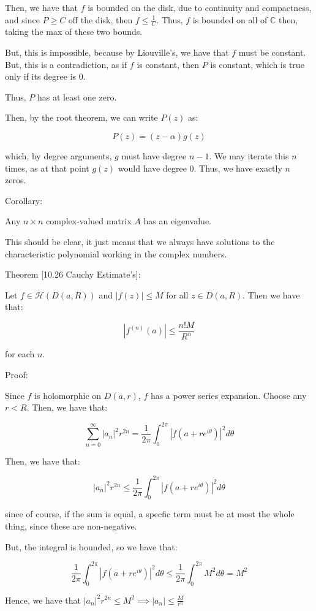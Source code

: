 \documentclass[10pt]{article}
\newcommand{\calH}{\mathcal{H}}
\begin{document}
Then, we have that $f$ is bounded on the disk, due to continuity and compactness, and since $P \geq C$ off the disk, then $f \leq \frac{1}{C}$. Thus, $f$ is bounded on all of $\mathbb{C}$ then, taking the max of these two bounds.

But, this is impossible, because by Liouville’s, we have that $f$ must be constant. But, this is a contradiction, as if $f$ is constant, then $P$ is constant, which is true only if its degree is $0$.

Thus, $P$ has at least one zero.

Then, by the root theorem, we can write $P(z)$ as:

$$P(z) = (z - \alpha) g(z)$$

which, by degree arguments, $g$ must have degree $n-1$. We may iterate this $n$ times, as at that point $g(z)$ would have degree $0$. Thus, we have exactly $n$ zeros.

Corollary:

Any $n \times n$ complex-valued matrix $A$ has an eigenvalue.

This should be clear, it just means that we always have solutions to the characteristic polynomial working in the complex numbers.

Theorem [10.26 Cauchy Estimate’s]:

Let $f \in \calH(D(a,R))$ and $|f(z)| \leq M$ for all $z \in D(a,R)$. Then we have that:

$$| f^{(n)}(a)| \leq \frac{n!M}{R^n}$$

for each $n$.

Proof:

Since $f$ is holomorphic on $D(a,r)$, $f$ has a power series expansion.  Choose any $r < R$. Then, we have that:

$$ \sum_{n=0}^\infty |a_n|^2 r^{2n} = \frac{1}{2\pi} \int_0^{2\pi} | f(a + re^{i\theta}) |^2 d\theta $$

Then, we have that:

$$ |a_n|^2 r^{2n} \leq \frac{1}{2\pi} \int_0^{2\pi} | f(a + re^{i\theta}) |^2 d\theta$$

since of course, if the sum is equal, a specfic term must be at most the whole thing, since these are non-negative.

But, the integral is bounded, so we have that:

$$ \frac{1}{2\pi} \int_0^{2\pi} | f(a + re^{i\theta}) |^2 d\theta \leq \frac{1}{2\pi} \int_0^{2\pi} M^2 d\theta  = M^2$$

Hence, we have that $|a_n|^2 r^{2n} \leq M^2 \implies |a_n| \leq \frac{M}{r^n} $
\end{document}
